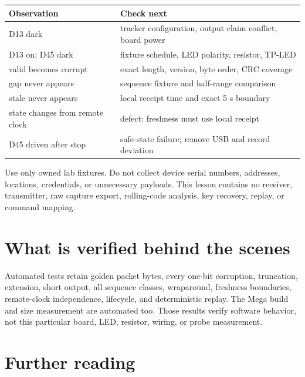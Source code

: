 \documentclass[11pt]{article}
\begin{document}
\begin{tabularx}{\linewidth}{@{}l X@{}}
\toprule
Observation & Check next\\
\midrule
D13 dark & tracker configuration, output claim conflict, board power\\
D13 on; D45 dark & fixture schedule, LED polarity, resistor, TP-LED\\
valid becomes corrupt & exact length, version, byte order, CRC coverage\\
gap never appears & sequence fixture and half-range comparison\\
stale never appears & local receipt time and exact 5 s boundary\\
state changes from remote clock & defect: freshness must use local receipt\\
D45 driven after stop & safe-state failure; remove USB and record deviation\\
\bottomrule
\end{tabularx}

Use only owned lab fixtures. Do not collect device serial numbers, addresses,
locations, credentials, or unnecessary payloads. This lesson contains no
receiver, transmitter, raw capture export, rolling-code analysis, key
recovery, replay, or command mapping.

\section{What is verified behind the scenes}

Automated tests retain golden packet bytes, every one-bit corruption,
truncation, extension, short output, all sequence classes, wraparound,
freshness boundaries, remote-clock independence, lifecycle, and deterministic
replay. The Mega build and size measurement are automated too. Those results
verify software behavior, not this particular board, LED, resistor, wiring, or
probe measurement.

\section{Further reading}
\end{document}
